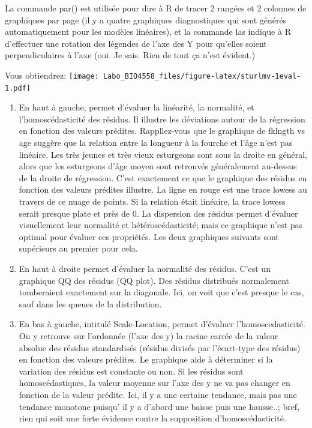 \documentclass[12pt,]{book}
\providecommand{\tightlist}{%
  \setlength{\itemsep}{0pt}\setlength{\parskip}{0pt}}
\begin{document}
La commande par() est utilisée pour dire à R de tracer 2 rangées et 2 colonnes de graphiques par page (il y a quatre graphiques diagnostiques qui sont générés automatiquement pour les modèles linéaires), et la commande las indique à R d'effectuer une rotation des légendes de l'axe des Y pour qu'elles soient perpendiculaires à l'axe (oui. Je sais. Rien de tout ça n'est évident.)

Vous obtiendrez:
\texttt{[image: Labo\_BIO4558\_files/figure-latex/sturlmv-1eval-1.pdf]}

\begin{enumerate}
\def\labelenumi{\arabic{enumi}.}
\tightlist
\item
  En haut à gauche, permet d'évaluer la linéarité, la normalité, et l'homoscédasticité des résidus. Il illustre les déviations autour de la régression en fonction des valeurs prédites. Rappllez-vous que le graphique de fklngth vs age suggère que la relation entre la longueur à la fourche et l'âge n'est pas linéaire. Les très jeunes et très vieux esturgeons sont sous la droite en général, alors que les esturgeons d'âge moyen sont retrouvés généralement au-dessus de la droite de régression. C'est exactement ce que le graphique des résidus en fonction des valeurs prédites illustre. La ligne en rouge est une trace lowess au travers de ce nuage de points. Si la relation était linéaire, la trace lowess serait presque plate et près de 0. La dispersion des résidus permet d'évaluer visuellement leur normalité et hétéroscédasticité; mais ce graphique n'est pas optimal pour évaluer ces propriétés. Les deux graphiques suivants sont supérieurs au premier pour cela.
\item
  En haut à droite permet d'évaluer la normalité des résidus. C'est un graphique QQ des résidus (QQ plot). Des résidus distribués normalement tomberaient exactement sur la diagonale. Ici, on voit que c'est presque le cas, sauf dans les queues de la distribution.
\item
  En bas à gauche, intitulé Scale-Location, permet d'évaluer l'homoscedasticité. On y retrouve sur l'ordonnée (l'axe des y) la racine carrée de la valeur absolue des résidus standardisés (résidus divisés par l'écart-type des résidus) en fonction des valeurs prédites. Le graphique aide à déterminer si la variation des résidus est constante ou non. Si les résidus sont homoscédastiques, la valeur moyenne sur l'axe des y ne va pas changer en fonction de la valeur prédite. Ici, il y a une certaine tendance, mais pas une tendance monotone puisqu' il y a d'abord une baisse puis une hausse..; bref, rien qui soit une forte évidence contre la supposition d'homoscédasticité.

\end{enumerate}
\end{document}
